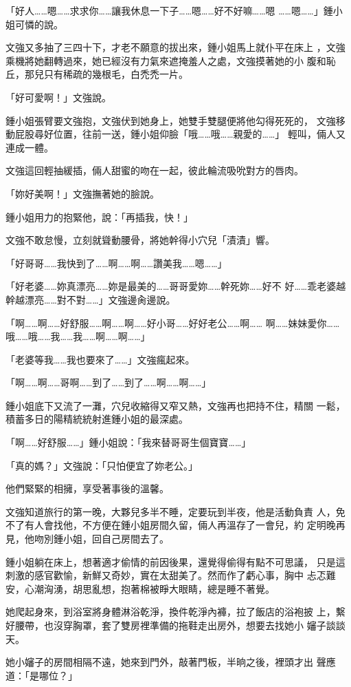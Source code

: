 「好人……嗯……求求你……讓我休息一下子……嗯……好不好嘛……嗯
……嗯……」鍾小姐可憐的說。

文強又多抽了三四十下，才老不願意的拔出來，鍾小姐馬上就仆平在床上
，文強乘機將她翻轉過來，她已經沒有力氣來遮掩羞人之處，文強摸著她的小
腹和恥丘，那兒只有稀疏的幾根毛，白禿禿一片。

「好可愛啊！」文強說。

鍾小姐張臂要文強抱，文強伏到她身上，她雙手雙腿便將他勾得死死的，
文強移動屁股尋好位置，往前一送，鍾小姐仰臉「哦……哦……親愛的……」
輕叫，倆人又連成一體。

文強這回輕抽緩插，倆人甜蜜的吻在一起，彼此輪流吸吮對方的唇肉。

「妳好美啊！」文強撫著她的臉說。

鍾小姐用力的抱緊他，說：「再插我，快！」

文強不敢怠慢，立刻就聳動腰骨，將她幹得小穴兒「漬漬」響。

「好哥哥……我快到了……啊……啊……讚美我……嗯……」

「好老婆……妳真漂亮……妳是最美的……哥哥愛妳……幹死妳……好不
好……乖老婆越幹越漂亮……對不對……」文強邊肏邊說。

「啊……啊……好舒服……啊……啊……好小哥……好好老公……啊……
啊……妹妹愛你……哦……哦……我……我……啊……啊……」

「老婆等我……我也要來了……」文強瘋起來。

「啊……啊……哥啊……到了……到了……啊……啊……」

鍾小姐底下又流了一灘，穴兒收縮得又窄又熱，文強再也把持不住，精關
一鬆，積蓄多日的陽精統統射進鍾小姐的最深處。

「啊……好舒服……」鍾小姐說：「我來替哥哥生個寶寶……」

「真的媽？」文強說：「只怕便宜了妳老公。」

他們緊緊的相擁，享受著事後的溫馨。

文強知道旅行的第一晚，大夥兒多半不睡，定要玩到半夜，他是活動負責
人，免不了有人會找他，不方便在鍾小姐房間久留，倆人再溫存了一會兒，約
定明晚再見，他吻別鍾小姐，回自己房間去了。

鍾小姐躺在床上，想著適才偷情的前因後果，還覺得偷得有點不可思議，
只是這刺激的感官歡愉，新鮮又奇妙，實在太甜美了。然而作了虧心事，胸中
忐忑難安，心潮洶湧，胡思亂想，抱著棉被睜大眼睛，總是睡不著覺。

她爬起身來，到浴室將身體淋浴乾淨，換件乾淨內褲，拉了飯店的浴袍披
上，繫好腰帶，也沒穿胸罩，套了雙房裡準備的拖鞋走出房外，想要去找她小
嬸子談談天。

她小嬸子的房間相隔不遠，她來到門外，敲著門板，半晌之後，裡頭才出
聲應道：「是哪位？」


